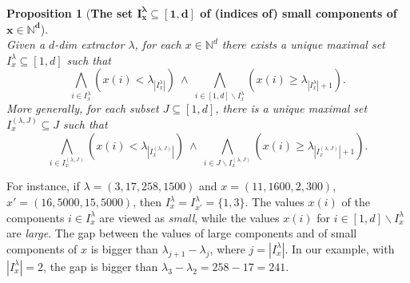 \documentclass[11pt,a4paper]{amsart}
\newcommand{\Nat}{\mathbb{N}}
\newcommand{\setN}{\Nat}
\theoremstyle{plain}
\newtheorem{prop}[thm]{Proposition}
\theoremstyle{definition}
\theoremstyle{defC}
\theoremstyle{thmC}
\begin{document}
\begin{prop}[\textbf{The set $\bm{I^\lambda_x\subseteq[1,d]}$ of
	(indices of) small
	components of $\bm{x\in\setN^d}$}]\label{prop:Ilambdax}
\hfill\\	
Given a $d$-dim extractor $\lambda$,
for each $x\in\setN^{d}$ there exists a unique maximal
	set $I_x^\lambda\subseteq [1,d]$ such that 
	\[\bigwedge_{i\in
	I^\lambda_x}\left(x(i)<\lambda_{|I^\lambda_x|}\right)\ \land\ 
	\bigwedge_{i\in[1,d]\smallsetminus
	I^\lambda_x}\left(x(i)\geq\lambda_{|I^\lambda_x|+1}\right).
	\]
	More generally, for each subset $J\subseteq [1,d]$, there is 	a unique maximal
	set $I_x^{(\lambda,J)}\subseteq J$ such that 
	\[\bigwedge_{i\in
	I^{(\lambda,J)}_x}\left(x(i)<\lambda_{|I^{(\lambda,J)}_x|}\right)\
	\land \
	\bigwedge_{i\in J\smallsetminus
	I^{(\lambda,J)}_x}\left(x(i)\geq\lambda_{|I^{(\lambda,J)}_x|+1}\right).
	\]
\end{prop}	
\noindent
For instance, if $\lambda=(3,17,258,1500)$ and $x=(11,1600,2,300)$,
$x'=(16,5000,15,5000)$, then $I^\lambda_x=I^\lambda_{x'}=\{1,3\}$.
The values $x(i)$ of the  components $i\in I^\lambda_x$ are viewed as
\emph{small}, while the values $x(i)$ for $i\in [1,d]\smallsetminus I^\lambda_x$ are
\emph{large}. The gap between the values of large components and of
small components of $x$ is bigger
than $\lambda_{j+1}-\lambda_j$, where $j=|I^\lambda_x|$.
In our example, with $|I^\lambda_x|=2$, the gap is bigger than $\lambda_3-\lambda_2=258-17=241$.
\end{document}
